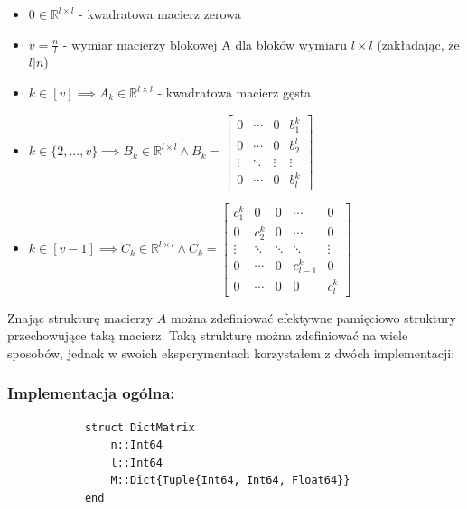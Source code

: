 \documentclass[11pt]{article}
\begin{document}
    \begin{itemize}
        \item $0 \in \mathbb{R}^{l \times l}$ - kwadratowa macierz zerowa
        \item $v = \frac{n}{l}$ - wymiar macierzy blokowej A dla bloków wymiaru $l \times l$ (zakładając, że $l | n$)
        \item $k \in [v] \implies A_k \in \mathbb{R}^{l \times l}$ - kwadratowa macierz gęsta
        \item
            $
            k \in \{2, ..., v\} \implies B_k \in \mathbb{R}^{l \times l}
            \land B_k =
            \begin{bmatrix}
                0      & \dotsb & 0      & b^k_1  \\
                0      & \dotsb & 0      & b^l_2  \\
                \vdots & \ddots & \vdots & \vdots \\
                0      & \dotsb & 0      & b^k_l
            \end{bmatrix}
            $
        \item
            $
            k \in [v - 1] \implies C_k \in \mathbb{R}^{l \times l}
            \land C_k =
            \begin{bmatrix}
                c^k_1  & 0      & 0      & \dotsb    & 0      \\
                0      & c^k_2  & 0      & \dotsb    & 0      \\
                \vdots & \ddots & \ddots & \ddots    & \vdots \\
                0      & \dotsb & 0      & c^k_{l-1} & 0      \\
                0      & \dotsb & 0      & 0         & c^k_l
            \end{bmatrix}
            $
    \end{itemize}

    \newpage

    \noindent
    Znając strukturę macierzy $A$ można zdefiniować efektywne pamięciowo struktury przechowujące taką macierz. Taką strukturę można zdefiniować na wiele sposobów, jednak w swoich eksperymentach korzystałem z dwóch implementacji:
    \newline

    \subsubsection*{Implementacja ogólna:}
        \begin{lstlisting}
            struct DictMatrix
                n::Int64
                l::Int64
                M::Dict{Tuple{Int64, Int64, Float64}}
            end
        \end{lstlisting}
\end{document}
